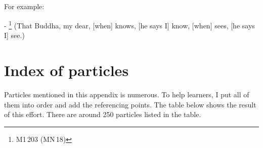 \subsection*{}\label{nip:hi}
For example:\par
- \footnote{M1\,203 (MN\,18)} (That Buddha, my dear, [when] knows, [he says I] know, [when] sees, [he says I] see.) \par

\section*{Index of particles}

Particles mentioned in this appendix is numerous. To help learners, I put all of them into order and add the referencing points. The table below shows the result of this effort. There are around 250 particles listed in the table.

